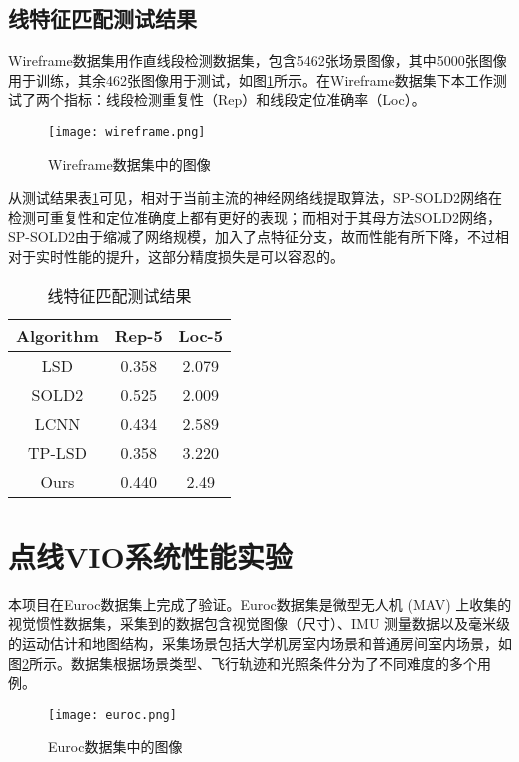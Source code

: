 \subsection{线特征匹配测试结果}
Wireframe数据集用作直线段检测数据集，包含5462张场景图像，其中5000张图像用于训练，其余462张图像用于测试，如图\ref{fig_wireframe}所示。在Wireframe数据集下本工作测试了两个指标：线段检测重复性（Rep）和线段定位准确率（Loc）。
\begin{figure}
  \centering
  \texttt{[image: wireframe.png]}
  \caption{Wireframe数据集中的图像}
  \label{fig_wireframe}
\end{figure}

从测试结果表\ref{tab_lineres}可见，相对于当前主流的神经网络线提取算法，SP-SOLD2网络在检测可重复性和定位准确度上都有更好的表现；而相对于其母方法SOLD2网络，SP-SOLD2由于缩减了网络规模，加入了点特征分支，故而性能有所下降，不过相对于实时性能的提升，这部分精度损失是可以容忍的。
\begin{table}[!ht]
  \centering
  \begin{tabular}{|c|c|c|}
  \hline
      Algorithm & Rep-5 & Loc-5 \\ \hline
      LSD & 0.358 & 2.079 \\ \hline
      SOLD2 & 0.525 & 2.009 \\ \hline
      LCNN & 0.434 & 2.589 \\ \hline
      TP-LSD & 0.358 & 3.220 \\ \hline
      Ours & 0.440 & 2.49 \\ \hline
  \end{tabular}
  \caption{线特征匹配测试结果}
  \label{tab_lineres}
\end{table}

\section{点线VIO系统性能实验}
本项目在Euroc数据集\cite{burri2016euroc}上完成了验证。Euroc数据集是微型无人机 (MAV) 上收集的视觉惯性数据集，采集到的数据包含视觉图像（尺寸）、IMU 测量数据以及毫米级的运动估计和地图结构，采集场景包括大学机房室内场景和普通房间室内场景，如图\ref{fig_euroc}所示。数据集根据场景类型、飞行轨迹和光照条件分为了不同难度的多个用例。
\begin{figure}
  \centering
  \texttt{[image: euroc.png]}
  \caption{Euroc数据集中的图像}
  \label{fig_euroc}
\end{figure}

